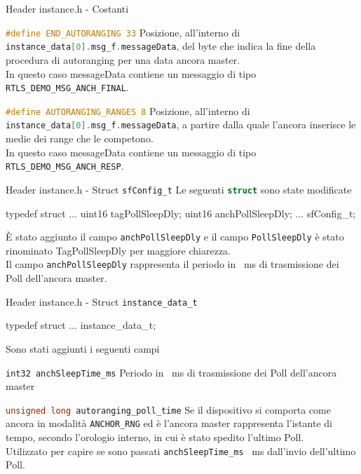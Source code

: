 \begin{frame}[fragile]{Header instance.h - Costanti}
  \begin{block}{\lstinline[language=C]!#define END_AUTORANGING 33!}
    Posizione, all'interno di \lstinline[language=C]!instance_data[0].msg_f.messageData!, del byte
    che indica la fine della procedura di autoranging per una data ancora master.\\
    In questo caso messageData contiene un messaggio di tipo \lstinline[language=C]!RTLS_DEMO_MSG_ANCH_FINAL!.
  \end{block}
  \begin{block}{\lstinline[language=C]!#define AUTORANGING_RANGES 8!}
    Posizione, all'interno di \lstinline[language=C]!instance_data[0].msg_f.messageData!, a partire dalla quale
    l'ancora inserisce le medie dei range che le competono.\\
    In questo caso messageData contiene un messaggio di tipo \lstinline[language=C]!RTLS_DEMO_MSG_ANCH_RESP!.
  \end{block}
\end{frame}

\begin{frame}[fragile]{Header instance.h - Struct \lstinline[language=C]!sfConfig_t!}
  Le seguenti \lstinline[language=C]!struct! sono state modificate
  \begin{C}
    typedef struct
    {
      ...
      uint16 tagPollSleepDly;
      uint16 anchPollSleepDly;
      ...
    } sfConfig_t;
  \end{C}
  È stato aggiunto il campo \lstinline[language=C]!anchPollSleepDly! e il campo \lstinline[language=C]!PollSleepDly! è stato rinominato
  TagPollSleepDly per maggiore chiarezza.\\
  Il campo \lstinline[language=C]!anchPollSleepDly! rappresenta il periodo in \SI{}{\milli\second} di trasmissione dei Poll
  dell'ancora master.

\end{frame}

\begin{frame}[fragile]{Header instance.h - Struct \lstinline[language=C]!instance_data_t!}
  \begin{C}
    typedef struct
    {
      ...
    } instance_data_t;
  \end{C}
  Sono stati aggiunti i seguenti campi
  \begin{block}{\lstinline[language=C]!int32 anchSleepTime_ms!}
    Periodo in \SI{}{\milli\second} di trasmissione dei Poll dell'ancora master
  \end{block}
  
  \begin{block}{\lstinline[language=C]!unsigned long autoranging_poll_time!}
    Se il dispositivo si comporta come ancora in modalità \lstinline[language=C]!ANCHOR_RNG! ed è l'ancora master
    rappresenta l'istante di tempo, secondo l'orologio interno, in cui è stato spedito l'ultimo Poll.\\
    Utilizzato per capire se sono passati \lstinline[language=C]!anchSleepTime_ms! \SI{}{\milli\second} dall'invio dell'ultimo Poll.\\
  \end{block}
\end{frame}


